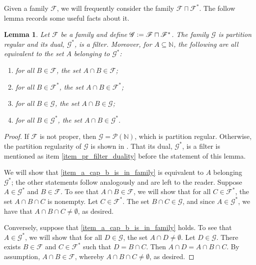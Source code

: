 \documentclass[letter,11pt]{article}
\theoremstyle{plain}
\newtheorem{lemma}[theorem]{Lemma}
\theoremstyle{definition}
\theoremstyle{plain}
\theoremstyle{plain}
\numberwithin{equation}{section}
\newcommand{\N}{\mathbb{N}}
\newcommand{\defeq}{\vcentcolon=}
\newcommand{\classcap}{\sqcap}
\newcommand{\family}{\mathscr{F}}
\newcommand{\familytwo}{\mathscr{G}}
\begin{document}
Given a family $\family$, we will frequently consider the family $\family \classcap \family^*$.  The follow lemma records some useful facts about it.

\begin{lemma}
\label{lemma_class_cap_is_pr}
    Let $\family$ be a family and define $\familytwo \defeq \family \classcap \family^*$.  The family $\familytwo$ is partition regular and its dual, $\familytwo^*$, is a filter.  Moreover, for $A \subseteq \N$, the following are all equivalent to the set $A$ belonging to $\familytwo^*$:
    \begin{enumerate}
        \item \label{item_a_cap_b_is_in_family} for all $B \in \family$, the set $A \cap B \in \family$;
        \item for all $B \in \family^*$, the set $A \cap B \in \family^*$;
        \item for all $B \in \familytwo$, the set $A \cap B \in \familytwo$;
        \item for all $B \in \familytwo^*$, the set $A \cap B \in \familytwo^*$.
    \end{enumerate}
\end{lemma}
\begin{proof}
    If $\family$ is not proper, then $\familytwo = \mathcal{P}(\N)$, which is partition regular.  Otherwise, the partition regularity of $\familytwo$ is shown in \cite[Prop. 2.5 (h)]{christopherson_johnson_2022}.  That its dual, $\familytwo^*$, is a filter is mentioned as item \eqref{item_pr_filter_duality} before the statement of this lemma.

    We will show that \eqref{item_a_cap_b_is_in_family} is equivalent to $A$ belonging $\familytwo^*$; the other statements follow analogously and are left to the reader.  Suppose $A \in \familytwo^*$ and $B \in \family$.  To see that $A \cap B \in \family$, we will show that for all $C \in \family^*$, the set $A \cap B \cap C$ is nonempty.  Let $C \in \family^*$.  The set $B \cap C \in \familytwo$, and since $A \in \familytwo^*$, we have that $A \cap B \cap C \neq \emptyset$, as desired.
    
    Conversely, suppose that \eqref{item_a_cap_b_is_in_family} holds.  To see that $A \in \familytwo^*$, we will show that for all $D \in \familytwo$, the set $A \cap D \neq \emptyset$.  Let $D \in \familytwo$.  There exists $B \in \family$ and $C \in \family^*$ such that $D = B \cap C$.  Then $A \cap D = A \cap B \cap C$.  By assumption, $A \cap B \in \family$, whereby $ A \cap B \cap C \neq \emptyset$, as desired.
\end{proof}
\end{document}
